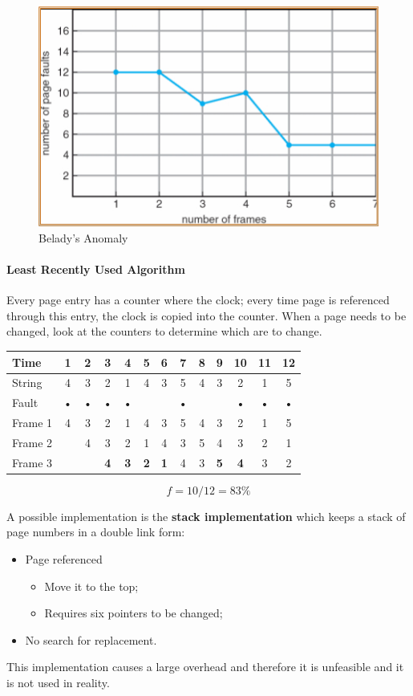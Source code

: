 \begin{figure}[hbtp]
\centering
\includegraphics[scale=0.4]{images/virtual_memory/belady_anomaly.jpg}
\caption{Belady's Anomaly}
\end{figure}

\paragraph{Least Recently Used Algorithm}
Every page entry has a counter where the clock; every time page is referenced through this entry, the clock is copied into the counter. When a page needs to be changed, look at the counters to determine which are to change.

\begin{center}
\begin{tabular}{l|cccccccccccc}
\hline 
Time & 1 & 2 & 3 & 4 & 5 & 6 & 7 & 8 & 9 & 10 & 11 & 12 \\ 
\hline 
String & 4 & 3 & 2 & 1 & 4 & 3 & 5 & 4 & 3 & 2 & 1 & 5 \\ 
\hline 
Fault & • & • & • & • & & & • & & & • & • & • \\ 
\hline 
Frame 1 & 4 & 3 & 2 & 1 & 4 & 3 & 5 & 4 & 3 & 2 & 1 & 5 \\ 
Frame 2 & & 4 & 3 & 2 & 1 & 4 & 3 & 5 & 4 & 3 & 2 & 1 \\ 
Frame 3 & & & \textbf{4} & \textbf{3} & \textbf{2} & \textbf{1} & 4 & 3 & \textbf{5} & \textbf{4} & 3 & 2 \\ 
\hline 
\end{tabular} 
\[ f = 10/12 = 83 \% \]
\end{center}

A possible implementation is the \textbf{stack implementation} which keeps a stack of page numbers in a double link form:
\begin{itemize}
\item Page referenced
\begin{itemize}
\item Move it to the top;
\item Requires six pointers to be changed;
\end{itemize}
\item No search for replacement.
\end{itemize}
This implementation causes a large overhead and therefore it is unfeasible and it is not used in reality.

